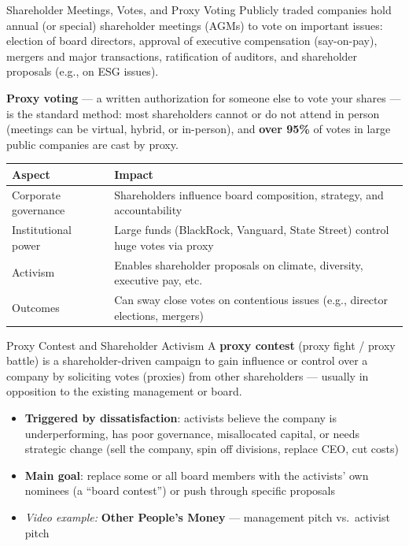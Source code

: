 \documentclass[aspectratio=169]{beamer}
\begin{document}
\begin{frame}{Shareholder Meetings, Votes, and Proxy Voting}
Publicly traded companies hold annual (or special) shareholder meetings (AGMs) to vote on important issues: election of board directors, approval of executive compensation (say-on-pay), mergers and major transactions, ratification of auditors, and shareholder proposals (e.g., on ESG issues).
\vspace{0.3em}

\textbf{Proxy voting} --- a written authorization for someone else to vote your shares --- is the standard method: most shareholders cannot or do not attend in person (meetings can be virtual, hybrid, or in-person), and \textbf{over 95\%} of votes in large public companies are cast by proxy.
\vspace{0.3em}

\begin{table}
\centering
\footnotesize
\begin{tabular}{p{}p{}}
\toprule
\textbf{Aspect} & \textbf{Impact} \\
\midrule
Corporate governance & Shareholders influence board composition, strategy, and accountability \\
Institutional power & Large funds (BlackRock, Vanguard, State Street) control huge votes via proxy \\
Activism & Enables shareholder proposals on climate, diversity, executive pay, etc. \\
Outcomes & Can sway close votes on contentious issues (e.g., director elections, mergers) \\
\bottomrule
\end{tabular}
\end{table}
\end{frame}

\begin{frame}{Proxy Contest and Shareholder Activism}
A \textbf{proxy contest} (proxy fight / proxy battle) is a shareholder-driven campaign to gain influence or control over a company by soliciting votes (proxies) from other shareholders --- usually in opposition to the existing management or board.
\vspace{0.3em}
\begin{itemize}
  \item \textbf{Triggered by dissatisfaction}: activists believe the company is underperforming, has poor governance, misallocated capital, or needs strategic change (sell the company, spin off divisions, replace CEO, cut costs)
  \item \textbf{Main goal}: replace some or all board members with the activists' own nominees (a ``board contest'') or push through specific proposals
  \item \emph{Video example:} \textbf{Other People's Money} --- management pitch vs.\ activist pitch
\end{itemize}
\end{frame}
\end{document}
